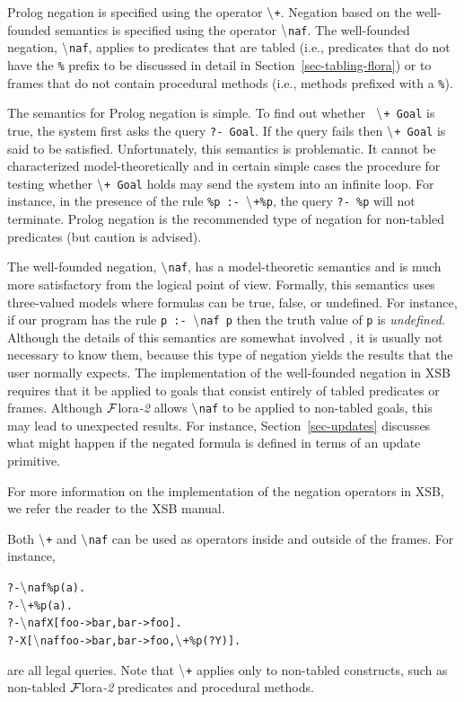 \documentclass[11pt]{article}
\newcommand{\FLSYSTEM}{{\mbox{\sc ${\cal F}${lora}\rm\emph{-2}}}\xspace}
\newcommand{\PLGNAF}{\mbox{\tt \ensuremath{\tt\backslash}+}\xspace}
\newcommand{\RULELOGNAF}{{\texttt{\ensuremath{\tt\backslash}naf}}\xspace}
\begin{document}
Prolog negation is specified using the operator \PLGNAF.
Negation based on the well-founded semantics is specified using the
operator \RULELOGNAF.  The well-founded negation, \RULELOGNAF, applies to predicates
that are tabled (i.e., predicates that do not have the {\tt \%} prefix
to be discussed in detail in Section~\ref{sec-tabling-flora}) or
to frames that do not contain procedural methods (i.e., methods
prefixed with a {\tt \%}).

The semantics for Prolog negation is simple. To find out whether {\tt
  \PLGNAF Goal} is true, the system first asks the query {\tt ?- Goal}. If the query
fails then {\tt \PLGNAF Goal} is said to be satisfied. Unfortunately, this
semantics is problematic. It cannot be characterized model-theoretically
and in certain simple cases the procedure for testing whether {\tt \PLGNAF
  Goal}
holds may send the system into an infinite loop. For instance, in the
presence of the rule {\tt \%p :- \PLGNAF \%p}, the query {\tt ?- \%p} will not
terminate.  Prolog negation is the recommended type of negation for
non-tabled predicates (but caution is advised).

The well-founded negation, \RULELOGNAF, has a model-theoretic semantics and is
much more
satisfactory from the logical point of view.
Formally, this semantics uses three-valued models where formulas can be
true, false, or undefined. For instance, if our program has the rule
{\tt p :- \RULELOGNAF p} then the truth value of {\tt p} is \emph{undefined}.  
Although the details of this
semantics are somewhat involved \cite{gelder-ross-schlipf-91}, it is
usually not necessary to know them, because this type of negation yields
the results that the user normally expects. The implementation of
the well-founded negation in XSB requires that it be applied to goals that
consist entirely of tabled predicates or frames.
Although \FLSYSTEM allows \RULELOGNAF to be applied to non-tabled goals,
this may lead to unexpected results.  For instance, 
Section~\ref{sec-updates} discusses what might happen if the
negated formula is defined in terms of an update primitive.

For more information on the implementation of the negation operators in
XSB, we refer the reader to the XSB manual.

Both \PLGNAF and \RULELOGNAF can be used as operators inside and outside of
the frames. For instance,
\begin{alltt}
       ?- \RULELOGNAF \%p(a).
       ?- \PLGNAF \%p(a).
       ?- \RULELOGNAF X[foo->bar, bar->foo].
       ?- X[\RULELOGNAF foo->bar, bar->foo, \PLGNAF \%p(?Y)].
\end{alltt}
are all legal queries. Note that \PLGNAF applies only to non-tabled
constructs, such as non-tabled \FLSYSTEM predicates and procedural methods.
\end{document}
